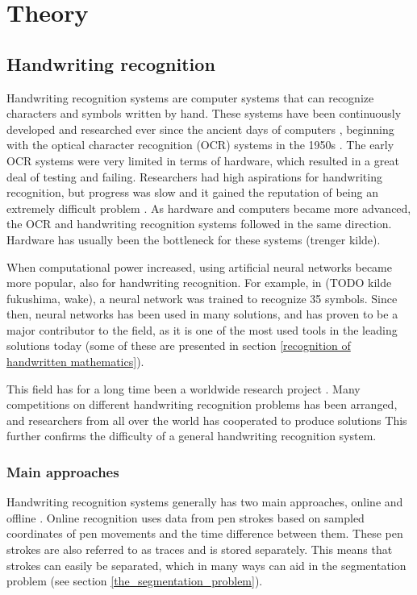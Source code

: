 \chapter{Theory}


\section{Handwriting recognition}
% 
Handwriting recognition systems are computer systems that can recognize characters and symbols written by hand. These systems have been continuously developed and researched ever since the ancient days of computers \parencite{simon_off-line_1992}, beginning with the optical character recognition (OCR) systems in the 1950s \parencite{mori_historical_1992}. The early OCR systems were very limited in terms of hardware, which resulted in a great deal of testing and failing. Researchers had high aspirations for handwriting recognition, but progress was slow and it gained the reputation of being an extremely difficult problem \parencite{simon_off-line_1992}. As hardware and computers became more advanced, the OCR and handwriting recognition systems followed in the same direction. Hardware has usually been the bottleneck for these systems (trenger kilde).

When computational power increased, using artificial neural networks became more popular, also for handwriting recognition. For example, in (TODO kilde fukushima, wake), a neural network was trained to recognize 35 symbols. Since then, neural networks has been used in many solutions, and has proven to be a major contributor to the field, as it is one of the most used tools in the leading solutions today (some of these are presented in section \ref{recognition of handwritten mathematics}).

This field has for a long time been a worldwide research project \parencite{mori_historical_1992}. Many competitions on different handwriting recognition problems has been arranged, and researchers from all over the world has cooperated to produce solutions This further confirms the difficulty of a general handwriting recognition system. 

\subsection{Main approaches}

Handwriting recognition systems generally has two main approaches, online and offline \parencite{priya_online_2016}. Online recognition uses data from pen strokes based on sampled coordinates of pen movements and the time difference between them. These pen strokes are also referred to as traces and is stored separately. This means that strokes can easily be separated, which in many ways can aid in the segmentation problem (see section \ref{the_segmentation_problem}).

